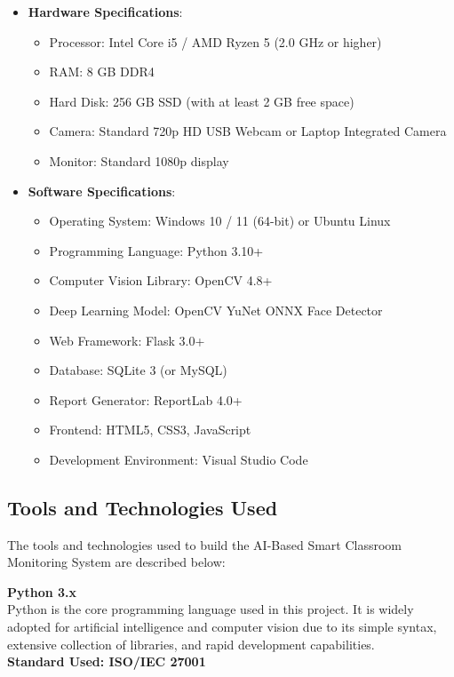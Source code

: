 \documentclass[10pt]{report}
\begin{document}
\begin{itemize}
    \item \textbf{Hardware Specifications}:
    \begin{itemize}
        \item Processor: Intel Core i5 / AMD Ryzen 5 (2.0 GHz or higher)
        \item RAM: 8 GB DDR4
        \item Hard Disk: 256 GB SSD (with at least 2 GB free space)
        \item Camera: Standard 720p HD USB Webcam or Laptop Integrated Camera
        \item Monitor: Standard 1080p display
    \end{itemize}
    \item \textbf{Software Specifications}:
    \begin{itemize}
        \item Operating System: Windows 10 / 11 (64-bit) or Ubuntu Linux
        \item Programming Language: Python 3.10+
        \item Computer Vision Library: OpenCV 4.8+
        \item Deep Learning Model: OpenCV YuNet ONNX Face Detector
        \item Web Framework: Flask 3.0+
        \item Database: SQLite 3 (or MySQL)
        \item Report Generator: ReportLab 4.0+
        \item Frontend: HTML5, CSS3, JavaScript
        \item Development Environment: Visual Studio Code
    \end{itemize}
\end{itemize}

\subsection{Tools and Technologies Used}
\hspace{0.5cm}The tools and technologies used to build the AI-Based Smart Classroom Monitoring System are described below:

\noindent\textbf{Python 3.x}\\
Python is the core programming language used in this project. It is widely adopted for artificial intelligence and computer vision due to its simple syntax, extensive collection of libraries, and rapid development capabilities.\\
\textbf{Standard Used: ISO/IEC 27001}
\end{document}
